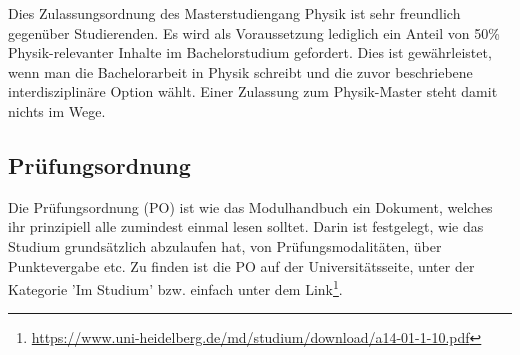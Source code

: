 Dies Zulassungsordnung des Masterstudiengang Physik ist sehr freundlich gegenüber Studierenden. Es wird als Voraussetzung lediglich ein Anteil von 50\% Physik-relevanter Inhalte im Bachelorstudium gefordert. Dies ist gewährleistet, wenn man die Bachelorarbeit in Physik schreibt und die zuvor beschriebene interdisziplinäre Option wählt. Einer Zulassung zum Physik-Master steht damit nichts im Wege.

\subsection{Prüfungsordnung}

Die Prüfungsordnung (PO) ist wie das Modulhandbuch ein Dokument, welches ihr prinzipiell alle zumindest einmal lesen solltet. Darin ist festgelegt, wie das Studium grundsätzlich abzulaufen hat, von Prüfungsmodalitäten, über Punktevergabe etc. Zu finden ist die PO auf der Universitätsseite, unter der Kategorie 'Im Studium' bzw. einfach unter dem Link\footnote{\url{https://www.uni-heidelberg.de/md/studium/download/a14-01-1-10.pdf}}.
